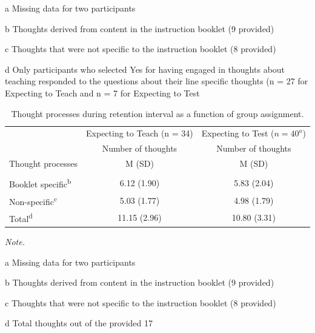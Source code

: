 \documentclass[
  english,
  man,floatsintext]{apa7}
\begin{document}
\begin{landscape}
\begin{table}
\begin{threeparttable}
\begin{tablenotes}
\item[a] Missing data for two participants
\item[b] Thoughts derived from content in the instruction booklet (9 provided)
\item[c] Thoughts that were not specific to the instruction booklet (8 provided)
\item[d] Only participants who selected Yes for having engaged in thoughts about teaching responded to the questions about their line specific thoughts (n = 27 for Expecting to Teach and n = 7 for Expecting to Test
\end{tablenotes}
\end{threeparttable}
\end{table}
\end{landscape}

\begin{landscape}\begin{table}

\caption{\label{tab:table5}Thought processes during retention interval as a function of group assignment.}
\fontsize{11}{13}\selectfont
\begin{threeparttable}
\begin{tabular}[t]{lcc}
\toprule
\multicolumn{1}{c}{ } & \multicolumn{1}{c}{Expecting to Teach (n = 34)} & \multicolumn{1}{c}{Expecting to Test ($n = 40^{a}$)} \\
\cmidrule(l{3pt}r{3pt}){2-2} \cmidrule(l{3pt}r{3pt}){3-3}
\multicolumn{1}{c}{ } & \multicolumn{1}{c}{Number of thoughts} & \multicolumn{1}{c}{Number of thoughts} \\
\cmidrule(l{3pt}r{3pt}){2-2} \cmidrule(l{3pt}r{3pt}){3-3}
Thought processes & M (SD) & M (SD)\\
\midrule
\addlinespace[0.3em]
\multicolumn{3}{l}{\textbf{Engaged in thoughts}}\\
\hspace{1em}Booklet specific\textsuperscript{b} & 6.12 (1.90) & 5.83 (2.04)\\
\hspace{1em}Non-specific\textsuperscript{c} & 5.03 (1.77) & 4.98 (1.79)\\
\hspace{1em}Total\textsuperscript{d} & 11.15 (2.96) & 10.80 (3.31)\\
\bottomrule
\end{tabular}
\begin{tablenotes}
\item \textit{Note.} 
\item[a] Missing data for two participants
\item[b] Thoughts derived from content in the instruction booklet (9 provided)
\item[c] Thoughts that were not specific to the instruction booklet (8 provided)
\item[d] Total thoughts out of the provided 17
\end{tablenotes}
\end{threeparttable}
\end{table}
\end{landscape}
\end{document}
